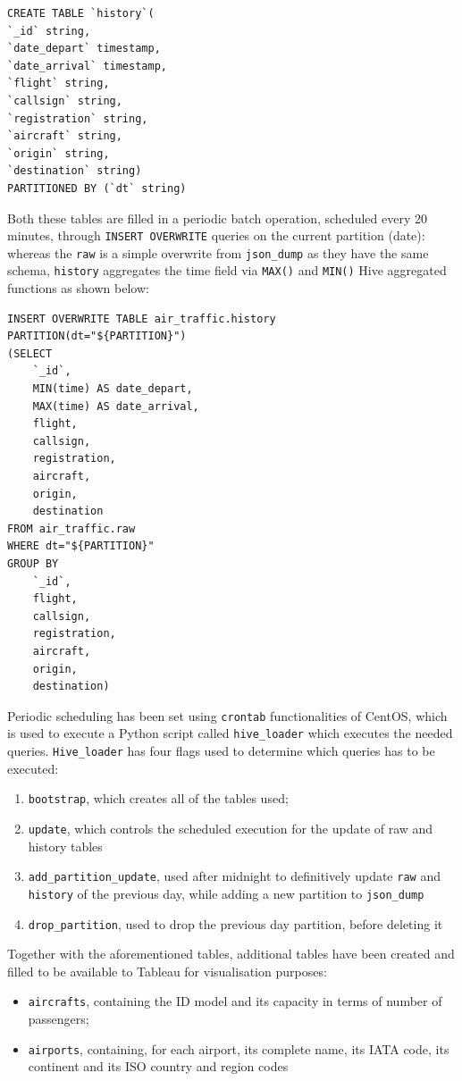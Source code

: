\begin{verbatim}
CREATE TABLE `history`(
`_id` string, 
`date_depart` timestamp, 
`date_arrival` timestamp, 
`flight` string, 
`callsign` string, 
`registration` string, 
`aircraft` string, 
`origin` string, 
`destination` string)
PARTITIONED BY (`dt` string)
\end{verbatim}

Both these tables are filled in a periodic batch operation, scheduled every 20 minutes, through \texttt{INSERT OVERWRITE} queries on the current partition (date): whereas the \texttt{raw} is a simple overwrite from \texttt{json\_dump} as they have the same schema,  \texttt{history} aggregates the time field via \texttt{MAX()} and \texttt{MIN()} Hive aggregated functions as shown below:

\begin{verbatim}
INSERT OVERWRITE TABLE air_traffic.history 
PARTITION(dt="${PARTITION}")
(SELECT
    `_id`,
    MIN(time) AS date_depart,
    MAX(time) AS date_arrival,
    flight,
    callsign,
    registration,
    aircraft,
    origin,
    destination
FROM air_traffic.raw
WHERE dt="${PARTITION}"
GROUP BY 
    `_id`,
    flight,
    callsign,
    registration,
    aircraft,
    origin,
    destination)
\end{verbatim}

Periodic scheduling has been set using \texttt{crontab} functionalities of CentOS, which is used to execute a Python script called \texttt{hive\_loader} which executes the needed queries. \texttt{Hive\_loader} has four flags used to determine which queries has to be executed:
\begin{enumerate}
    \item \texttt{bootstrap}, which creates all of the tables used;
    \item \texttt{update}, which controls the scheduled execution for the update of raw and history tables
    \item \texttt{add\_partition\_update}, used after midnight to definitively update \texttt{raw} and \texttt{history} of the previous day, while adding a new partition to \texttt{json\_dump}
    \item \texttt{drop\_partition}, used to drop the previous day partition, before deleting it
\end{enumerate}

Together with the aforementioned tables, additional tables have been created and filled to be available to Tableau for visualisation purposes:

\begin{itemize}
    \item \texttt{aircrafts}, containing the ID model and its capacity in terms of number of passengers;
    \item \texttt{airports}, containing, for each airport, its complete name, its IATA code, its continent and its ISO country and region codes
\end{itemize}